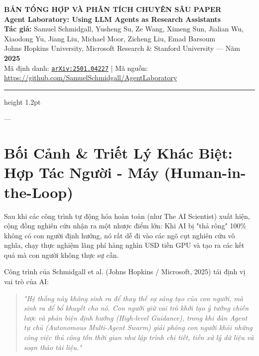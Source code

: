 \documentclass[11pt,a4paper]{article}
\begin{document}
\begin{center}
    {\Large\bfseries BẢN TỔNG HỢP VÀ PHÂN TÍCH CHUYÊN SÂU PAPER}\\[0.3cm]
    {\LARGE\bfseries Agent Laboratory: Using LLM Agents as Research Assistants}\\[0.4cm]
    {\normalsize\textbf{Tác giả:} Samuel Schmidgall, Yusheng Su, Ze Wang, Ximeng Sun, Jialian Wu,}\\
    {\normalsize Xiaodong Yu, Jiang Liu, Michael Moor, Zicheng Liu, Emad Barsoum}\\[0.15cm]
    {\small Johns Hopkins University, Microsoft Research \& Stanford University — Năm \textbf{2025}}\\[0.15cm]
    {\small Mã định danh: \href{https://arxiv.org/abs/2501.04227}{\texttt{arXiv:2501.04227}} \quad | \quad Mã nguồn: \url{https://github.com/SamuelSchmidgall/AgentLaboratory}}
\end{center}

\vspace{0.3cm}
\hrule height 1.2pt
\vspace{0.6cm}

---

\section{Bối Cảnh \& Triết Lý Khác Biệt: Hợp Tác Người - Máy (Human-in-the-Loop)}

Sau khi các công trình tự động hóa hoàn toàn (như The AI Scientist) xuất hiện, cộng đồng nghiên cứu nhận ra một nhược điểm lớn: Khi AI bị "thả rông" 100\% không có con người định hướng, nó rất dễ đi vào các ngõ cụt nghiên cứu vô nghĩa, chạy thực nghiệm lãng phí hàng nghìn USD tiền GPU và tạo ra các kết quả mà con người không thực sự cần.

\begin{coreconceptbox}
Công trình của Schmidgall et al. (Johns Hopkins / Microsoft, 2025) tái định vị vai trò của AI:
\begin{quote}
\textit{"Hệ thống này không sinh ra để thay thế sự sáng tạo của con người, mà sinh ra để bổ khuyết cho nó. Con người giữ vai trò khởi tạo ý tưởng chiến lược và phản biện định hướng (High-level Guidance), trong khi đàn Agent tự chủ (Autonomous Multi-Agent Swarm) giải phóng con người khỏi những công việc thủ công tốn thời gian như lập trình chi tiết, tiền xử lý dữ liệu và soạn thảo tài liệu."}
\end{quote}
\end{coreconceptbox}
\end{document}
